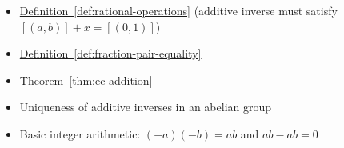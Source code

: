 \begin{dependencies}
\begin{itemize}
  \item \hyperref[def:rational-operations]{Definition~\ref*{def:rational-operations}}
        \textnormal{(additive inverse must satisfy $[(a,b)] + x = [(0,1)]$)}
  \item \hyperref[def:fraction-pair-equality]{Definition~\ref*{def:fraction-pair-equality}}
  \item \hyperref[thm:ec-addition]{Theorem~\ref*{thm:ec-addition}}
  \item Uniqueness of additive inverses in an abelian group
  \item Basic integer arithmetic: $(-a)(-b) = ab$ and $ab - ab = 0$
\end{itemize}
\end{dependencies}
